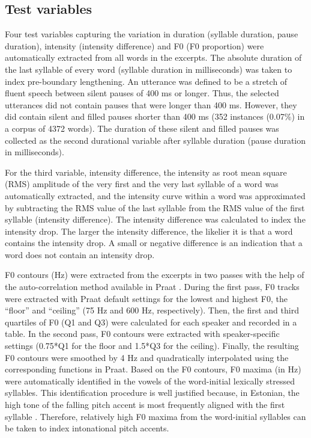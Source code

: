 \documentclass[output=paper]{langscibook}
\begin{document}
    \subsection{Test variables} 
    Four test variables capturing the variation in duration (syllable duration, pause duration), intensity (intensity difference) and F0 (F0 proportion) were automatically extracted from all words in the excerpts. The absolute duration of the last syllable of every word (syllable duration in milliseconds) was taken to index pre-boundary lengthening. An utterance was defined to be a stretch of fluent speech between silent pauses of 400 ms or longer. Thus, the selected utterances did not contain pauses that were longer than 400 ms. However, they did contain silent and filled pauses shorter than 400 ms (352 instances (0.07\%) in a corpus of 4372 words). The duration of these silent and filled pauses was collected as the second durational variable after syllable duration (pause duration in milliseconds).\largerpage[2]

    For the third variable, intensity difference, the intensity as root mean square (RMS) amplitude of the very first and the very last syllable of a word was automatically extracted, and the intensity curve within a word was approximated by subtracting the RMS value of the last syllable from the RMS value of the first syllable (intensity difference). The intensity difference was calculated to index the intensity drop. The larger the  intensity difference, the likelier it is that a word contains the intensity drop. A small or negative difference is an indication that a word does not contain an intensity drop.

    F0 contours (Hz) were extracted from the excerpts in two passes with the help of the auto-correlation method available in Praat \citep[][]{boersmaWeenink2019}. During the first pass, F0 tracks were extracted with Praat default settings for the lowest and highest F0, the “floor” and “ceiling” (75 Hz and 600 Hz, respectively). Then, the first and third quartiles of F0 (Q1 and Q3) were calculated for each speaker and recorded in a table. In the second pass, F0 contours were extracted with speaker-specific settings (0.75*Q1 for the floor and 1.5*Q3 for the ceiling). Finally, the resulting F0 contours were smoothed by 4 Hz and quadratically interpolated using the corresponding functions in Praat. Based on the F0 contours, F0 maxima (in Hz) were automatically identified in the vowels of the word-initial lexically stressed syllables. This identification procedure is well justified because, in Estonian, %
    the high tone of the falling pitch accent is most frequently aligned with the first syllable \citep[see, e.g.,][]{asuNolan1999}. Therefore, relatively high F0 maxima from the word-initial syllables can be taken to index intonational pitch accents.
    
\end{document}
